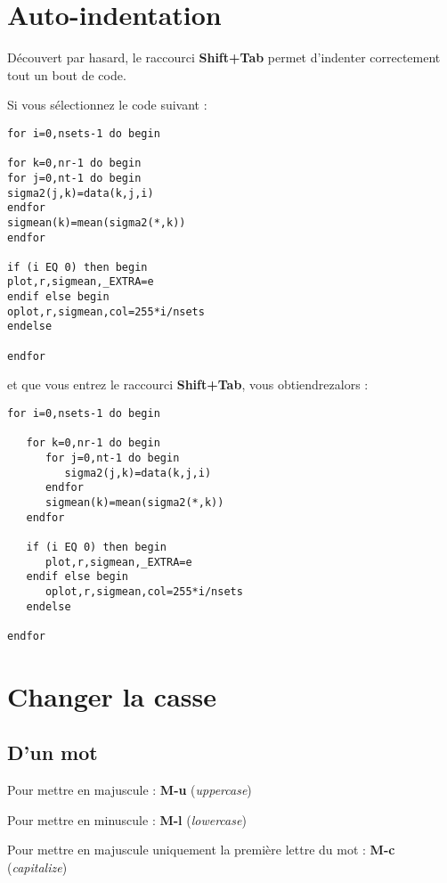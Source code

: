 \documentclass[a4paper,twoside]{article}
\newcommand{\raccourci}[1]{{\bfseries #1}}
\begin{document}
\section{Auto-indentation}
Découvert par hasard, le raccourci \raccourci{Shift+Tab} permet d'indenter correctement tout un bout de code. 

\begin{exemple}
Si vous sélectionnez le code suivant :
\begin{verbatim}
for i=0,nsets-1 do begin

for k=0,nr-1 do begin
for j=0,nt-1 do begin
sigma2(j,k)=data(k,j,i)
endfor
sigmean(k)=mean(sigma2(*,k))
endfor

if (i EQ 0) then begin
plot,r,sigmean,_EXTRA=e
endif else begin
oplot,r,sigmean,col=255*i/nsets
endelse

endfor
\end{verbatim}
et que vous entrez le raccourci \raccourci{Shift+Tab}, vous obtiendrez\footnotemark alors :
\begin{verbatim}
for i=0,nsets-1 do begin

   for k=0,nr-1 do begin
      for j=0,nt-1 do begin
         sigma2(j,k)=data(k,j,i)
      endfor
      sigmean(k)=mean(sigma2(*,k))
   endfor

   if (i EQ 0) then begin
      plot,r,sigmean,_EXTRA=e
   endif else begin
      oplot,r,sigmean,col=255*i/nsets
   endelse

endfor
\end{verbatim}

\end{exemple}


\section{Changer la casse}
\subsection{D'un mot}
Pour mettre en majuscule : \raccourci{M-u} (\emph{uppercase})

Pour mettre en minuscule : \raccourci{M-l} (\emph{lowercase})

Pour mettre en majuscule uniquement la première lettre du mot : \raccourci{M-c} (\emph{capitalize})
\end{document}
